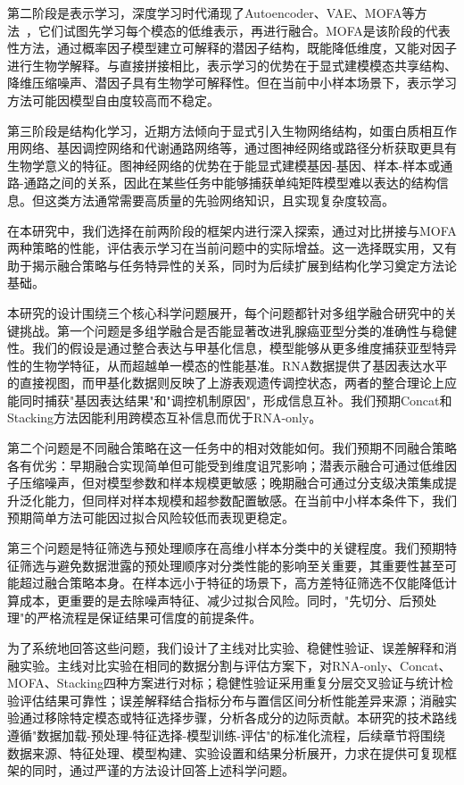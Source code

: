 第二阶段是表示学习，深度学习时代涌现了Autoencoder、VAE、MOFA等方法~\cite{mofa2018}，它们试图先学习每个模态的低维表示，再进行融合。MOFA是该阶段的代表性方法，通过概率因子模型建立可解释的潜因子结构，既能降低维度，又能对因子进行生物学解释。与直接拼接相比，表示学习的优势在于显式建模模态共享结构、降维压缩噪声、潜因子具有生物学可解释性。但在当前中小样本场景下，表示学习方法可能因模型自由度较高而不稳定。

第三阶段是结构化学习，近期方法倾向于显式引入生物网络结构，如蛋白质相互作用网络、基因调控网络和代谢通路网络等，通过图神经网络或路径分析获取更具有生物学意义的特征。图神经网络的优势在于能显式建模基因-基因、样本-样本或通路-通路之间的关系，因此在某些任务中能够捕获单纯矩阵模型难以表达的结构信息。但这类方法通常需要高质量的先验网络知识，且实现复杂度较高。

在本研究中，我们选择在前两阶段的框架内进行深入探索，通过对比拼接与MOFA两种策略的性能，评估表示学习在当前问题中的实际增益。这一选择既实用，又有助于揭示融合策略与任务特异性的关系，同时为后续扩展到结构化学习奠定方法论基础。

本研究的设计围绕三个核心科学问题展开，每个问题都针对多组学融合研究中的关键挑战。第一个问题是多组学融合是否能显著改进乳腺癌亚型分类的准确性与稳健性。我们的假设是通过整合表达与甲基化信息，模型能够从更多维度捕获亚型特异性的生物学特征，从而超越单一模态的性能基准。RNA数据提供了基因表达水平的直接视图，而甲基化数据则反映了上游表观遗传调控状态，两者的整合理论上应能同时捕获"基因表达结果"和"调控机制原因"，形成信息互补。我们预期Concat和Stacking方法因能利用跨模态互补信息而优于RNA-only。

第二个问题是不同融合策略在这一任务中的相对效能如何。我们预期不同融合策略各有优劣：早期融合实现简单但可能受到维度诅咒影响；潜表示融合可通过低维因子压缩噪声，但对模型参数和样本规模更敏感；晚期融合可通过分支级决策集成提升泛化能力，但同样对样本规模和超参数配置敏感。在当前中小样本条件下，我们预期简单方法可能因过拟合风险较低而表现更稳定。

第三个问题是特征筛选与预处理顺序在高维小样本分类中的关键程度。我们预期特征筛选与避免数据泄露的预处理顺序对分类性能的影响至关重要，其重要性甚至可能超过融合策略本身。在样本远小于特征的场景下，高方差特征筛选不仅能降低计算成本，更重要的是去除噪声特征、减少过拟合风险。同时，"先切分、后预处理"的严格流程是保证结果可信度的前提条件。

为了系统地回答这些问题，我们设计了主线对比实验、稳健性验证、误差解释和消融实验。主线对比实验在相同的数据分割与评估方案下，对RNA-only、Concat、MOFA、Stacking四种方案进行对标；稳健性验证采用重复分层交叉验证与统计检验评估结果可靠性；误差解释结合指标分布与置信区间分析性能差异来源；消融实验通过移除特定模态或特征选择步骤，分析各成分的边际贡献。本研究的技术路线遵循"数据加载-预处理-特征选择-模型训练-评估"的标准化流程，后续章节将围绕数据来源、特征处理、模型构建、实验设置和结果分析展开，力求在提供可复现框架的同时，通过严谨的方法设计回答上述科学问题。
